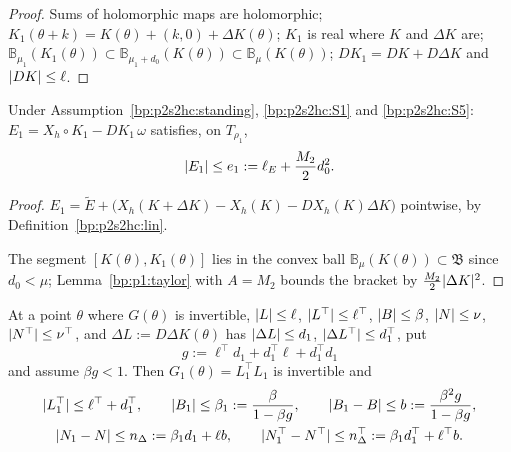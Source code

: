 \begin{proof}
\label{step:p2s2hc:st}
Sums of holomorphic maps are holomorphic; $K_1(\theta+k)=K(\theta)+(k,0)+\Delta K(\theta)$; $K_1$ is real where $K$ and $\Delta K$ are;
$\mathbb B_{\mu_1}(K_1(\theta))\subset\mathbb B_{\mu_1+d_0}(K(\theta))\subset\mathbb B_\mu(K(\theta))$; $DK_1=DK+D\Delta K$ and $\lvert DK\rvert\le\ell$.
\end{proof}

\begin{lemma}\label{bp:p2s2hc:error}
Under Assumption~\ref{bp:p2s2hc:standing}, \ref{bp:p2s2hc:S1} and \ref{bp:p2s2hc:S5}: $E_1=X_h\circ K_1-DK_1\,\omega$ satisfies, on $T_{\rho_1}$,
\[
\lvert E_1\rvert\le e_1:=\ell_E+\frac{M_2}2d_0^2 .
\]
\end{lemma}

\begin{proof}
\label{step:p2s2hc:er-id}
$E_1=\tilde E+\bigl(X_h(K+\Delta K)-X_h(K)-DX_h(K)\Delta K\bigr)$ pointwise, by Definition~\ref{bp:p2s2hc:lin}.

\label{step:p2s2hc:er-tay}
The segment $[K(\theta),K_1(\theta)]$ lies in the convex ball $\mathbb B_\mu(K(\theta))\subset\mathfrak B$ since $d_0<\mu$; Lemma~\ref{bp:p1:taylor} with $A=M_2$ bounds the
bracket by $\frac{M_2}2\lvert \Delta K\rvert^2$.
\end{proof}

\begin{lemma}\label{bp:p2s2hc:frames}
At a point $\theta$ where $G(\theta)$ is invertible, $\lvert L\rvert\le\ell$, $\lvert L^\top\rvert\le\ell^\top$, $\lvert B\rvert\le\beta$, $\lvert N\rvert\le\nu$, $\lvert N^\top\rvert\le\nu^\top$, and $\Delta L:=D\Delta K(\theta)$
has $\lvert \Delta L\rvert\le d_1$, $\lvert \Delta L^\top\rvert\le d_1^\top$, put
\[
g:=\ell^\top d_1+d_1^\top\ell+d_1^\top d_1
\]
and assume $\beta g<1$. Then $G_1(\theta)=L_1^\top L_1$ is invertible and
\begin{gather*}
\lvert L_1^\top\rvert\le\ell^\top+d_1^\top,\qquad\lvert B_1\rvert\le\beta_1:=\frac{\beta}{1-\beta g},\qquad\lvert B_1-B\rvert\le b:=\frac{\beta^2g}{1-\beta g},\\
\lvert N_1-N\rvert\le n_\Delta:=\beta_1d_1+\ell b,\qquad\lvert N_1^\top-N^\top\rvert\le n_\Delta^\top:=\beta_1d_1^\top+\ell^\top b .
\end{gather*}
\end{lemma}

